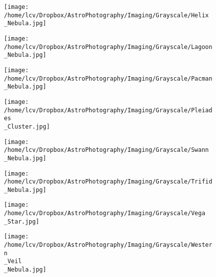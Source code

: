 \newpage
\begin{figure}[phbt]
	\texttt{[image: /home/lcv/Dropbox/AstroPhotography/Imaging/Grayscale/Helix\\\_Nebula.jpg]}


\end{figure}
\newpage
\begin{figure}[phbt]
	\texttt{[image: /home/lcv/Dropbox/AstroPhotography/Imaging/Grayscale/Lagoon\\\_Nebula.jpg]}


\end{figure}
\newpage
\begin{figure}[phbt]
	\texttt{[image: /home/lcv/Dropbox/AstroPhotography/Imaging/Grayscale/Pacman\\\_Nebula.jpg]}


\end{figure}
\newpage
\begin{figure}[phbt]
	\texttt{[image: /home/lcv/Dropbox/AstroPhotography/Imaging/Grayscale/Pleiades\\\_Cluster.jpg]}


\end{figure}
\newpage
\begin{figure}[phbt]
	\texttt{[image: /home/lcv/Dropbox/AstroPhotography/Imaging/Grayscale/Swann\\\_Nebula.jpg]}


\end{figure}
\newpage
\begin{figure}[phbt]
	\texttt{[image: /home/lcv/Dropbox/AstroPhotography/Imaging/Grayscale/Trifid\\\_Nebula.jpg]}


\end{figure}
\newpage
\begin{figure}[phbt]
	\texttt{[image: /home/lcv/Dropbox/AstroPhotography/Imaging/Grayscale/Vega\\\_Star.jpg]}


\end{figure}
\newpage
\begin{figure}[phbt]
	\texttt{[image: /home/lcv/Dropbox/AstroPhotography/Imaging/Grayscale/Western\\\_Veil\\\_Nebula.jpg]}


\end{figure}
\newpage
